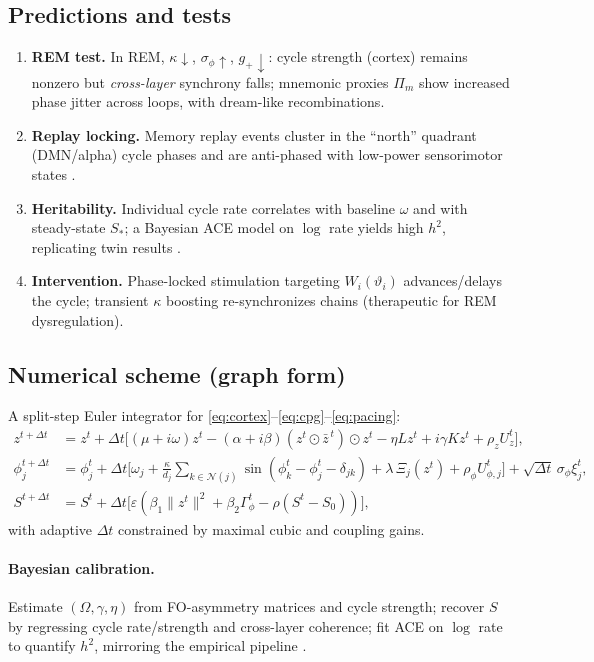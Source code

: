 \documentclass{article}
\begin{document}
\subsection{Predictions and tests}
\begin{enumerate}
\item \textbf{REM test.} In REM, $\kappa\!\downarrow$, $\sigma_\phi\!\uparrow$, $g_+\!\downarrow$: cycle strength (cortex) remains nonzero but \emph{cross-layer} synchrony falls; mnemonic proxies $\Pi_m$ show increased phase jitter across loops, with dream-like recombinations.
\item \textbf{Replay locking.} Memory replay events cluster in the ``north'' quadrant (DMN/alpha) cycle phases and are anti-phased with low-power sensorimotor states \citep{van2025cortical}.
\item \textbf{Heritability.} Individual cycle rate correlates with baseline $\omega$ and with steady-state $S_*$; a Bayesian ACE model on $\log$ rate yields high $h^2$, replicating twin results \citep{van2025cortical}.
\item \textbf{Intervention.} Phase-locked stimulation targeting $W_i(\vartheta_i)$ advances/delays the cycle; transient $\kappa$ boosting re-synchronizes chains (therapeutic for REM dysregulation).
\end{enumerate}

\subsection{Numerical scheme (graph form)}
A split-step Euler integrator for \eqref{eq:cortex}--\eqref{eq:cpg}--\eqref{eq:pacing}:
\[
\begin{aligned}
z^{t+\Delta t} &= z^t + \Delta t\big[(\mu+i\omega) z^t - (\alpha+i\beta)(z^t\!\odot\!\bar z^{\,t})\!\odot\! z^t
- \eta L z^t + i\gamma K z^t + \rho_z U_z^t \big],\\
\phi_j^{t+\Delta t} &= \phi_j^t + \Delta t\Big[\omega_j + \frac{\kappa}{d_j}\!\sum_{k\in\mathcal{N}(j)}\!
\sin(\phi_k^t-\phi_j^t-\delta_{jk}) + \lambda\,\Xi_j(z^t) + \rho_\phi U_{\phi,j}^t \Big] + \sqrt{\Delta t}\,\sigma_\phi \xi_j^t,\\
S^{t+\Delta t} &= S^t + \Delta t\big[\varepsilon(\beta_1\|z^t\|^2 + \beta_2 \Gamma_\phi^t - \rho(S^t-S_0))\big],
\end{aligned}
\]
with adaptive $\Delta t$ constrained by maximal cubic and coupling gains.

\paragraph{Bayesian calibration.} Estimate $(\Omega,\gamma,\eta)$ from FO-asymmetry matrices and cycle strength; recover $S$ by regressing cycle rate/strength and cross-layer coherence; fit ACE on $\log$ rate to quantify $h^2$, mirroring the empirical pipeline \citep{van2025cortical}.
\end{document}
